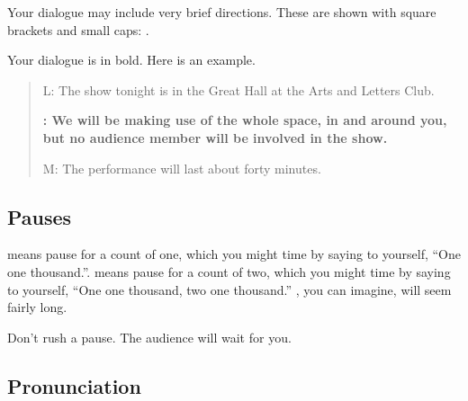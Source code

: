   \setlength{\fboxrule}{2pt}%
  \vspace{0.3\baselineskip}%
  \setlength{\fboxrule}{1pt}%
  \vspace{0.3\baselineskip}


\vspace{0.5\baselineskip}
\vspace{0.5\baselineskip}



Your dialogue may include very brief directions.  These are shown with square brackets and small caps: .

Your dialogue is in bold.  Here is an example.

\begin{quote}

L:  The show tonight is in the Great Hall at the Arts and Letters Club.

\textbf{\performerletter{\speaker}:   We will be making use of the whole space, in and around you, but no audience member will be involved in the show.}

M:  The performance will last about forty minutes.

\end{quote}

\subsection*{Pauses}

 means pause for a count of one, which you might time by saying to yourself, ``One one thousand.''.   means pause for a count of two, which you might time by saying to yourself, ``One one thousand, two one thousand.''  , you can imagine, will seem fairly long.

Don't rush a pause.  The audience will wait for you.

\subsection*{Pronunciation}

